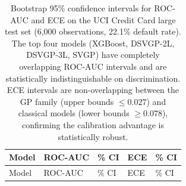 \documentclass[
  letterpaper,
  DIV=11,
  numbers=noendperiod]{scrartcl}
\begin{document}
\begin{longtable}[]{@{}
  >{\raggedright\arraybackslash}p{}
  >{\centering\arraybackslash}p{}
  >{\centering\arraybackslash}p{}
  >{\centering\arraybackslash}p{}
  >{\centering\arraybackslash}p{}@{}}
\caption{Bootstrap 95\% confidence intervals for ROC-AUC and ECE on the
UCI Credit Card large test set (6,000 observations, 22.1\% default
rate). The top four models (XGBoost, DSVGP-2L, DSVGP-3L, SVGP) have
completely overlapping ROC-AUC intervals and are statistically
indistinguishable on discrimination. ECE intervals are non-overlapping
between the GP family (upper bounds \(\leq 0.027\)) and classical models
(lower bounds \(\geq 0.078\)), confirming the calibration advantage is
statistically robust.}\label{tbl-app-uci-ci}\tabularnewline
\toprule\noalign{}
\begin{minipage}[b]{\linewidth}\raggedright
Model
\end{minipage} & \begin{minipage}[b]{\linewidth}\centering
ROC-AUC
\end{minipage} & \begin{minipage}[b]{\linewidth}\centering
95\% CI
\end{minipage} & \begin{minipage}[b]{\linewidth}\centering
ECE
\end{minipage} & \begin{minipage}[b]{\linewidth}\centering
95\% CI
\end{minipage} \\
\midrule\noalign{}
\endfirsthead
\toprule\noalign{}
\begin{minipage}[b]{\linewidth}\raggedright
Model
\end{minipage} & \begin{minipage}[b]{\linewidth}\centering
ROC-AUC
\end{minipage} & \begin{minipage}[b]{\linewidth}\centering
95\% CI
\end{minipage} & \begin{minipage}[b]{\linewidth}\centering
ECE
\end{minipage} & \begin{minipage}[b]{\linewidth}\centering
95\% CI
\end{minipage} \\

\end{longtable}
\end{document}
